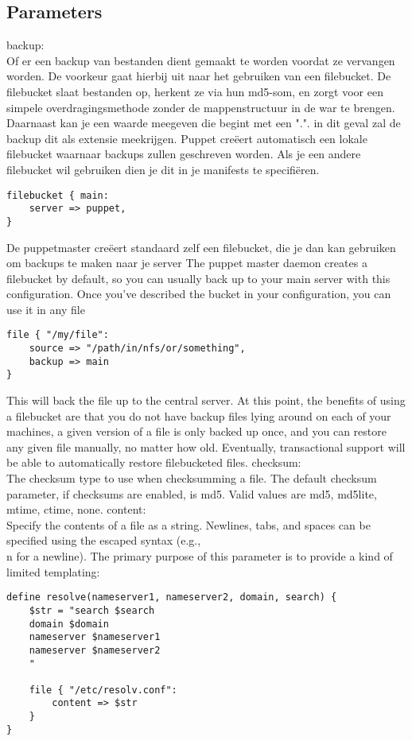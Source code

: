 \subsection{Parameters}
backup:\\
Of er een backup van bestanden dient gemaakt te worden voordat ze vervangen worden. De voorkeur gaat hierbij uit naar het gebruiken van een filebucket.	De filebucket slaat bestanden op, herkent ze via hun md5-som, en zorgt voor een simpele overdragingsmethode zonder de mappenstructuur in de war te brengen. Daarnaast kan je een waarde meegeven die begint met een ".". in dit geval zal de backup dit als extensie meekrijgen. Puppet cre\"{e}ert automatisch een lokale filebucket waarnaar backups zullen geschreven worden. Als je een andere filebucket wil gebruiken dien je dit in je manifests te specifi\"{e}ren.
\begin{code}
\begin{lstlisting}
filebucket { main:
	server => puppet,
}
\end{lstlisting}
\end{code}
%
De puppetmaster cre\"{e}ert standaard zelf een filebucket, die je dan kan gebruiken om backups te maken naar je server
The puppet master daemon creates a filebucket by default, so you can usually back up to your main server with this configuration. Once you've described the bucket in your configuration, you can use it in any file
%
\begin{code}
\begin{lstlisting}
file { "/my/file":
	source => "/path/in/nfs/or/something",
	backup => main
}
\end{lstlisting}
\end{code}
%
This will back the file up to the central server.
At this point, the benefits of using a filebucket are that you do not have backup files lying around on each of your machines, a given version of a file is only backed up once, and you can restore any given file manually, no matter how old. Eventually, transactional support will be able to automatically restore filebucketed files.
%
checksum:\\
The checksum type to use when checksumming a file.
The default checksum parameter, if checksums are enabled, is md5. Valid values are md5, md5lite, mtime, ctime, none.
%
content:\\
Specify the contents of a file as a string. Newlines, tabs, and spaces can be specified using the escaped syntax (e.g., \\n for a newline). The primary purpose of this parameter is to provide a kind of limited templating:
%
\begin{code}
\begin{lstlisting}
define resolve(nameserver1, nameserver2, domain, search) {
	$str = "search $search
	domain $domain
	nameserver $nameserver1
	nameserver $nameserver2
	"

	file { "/etc/resolv.conf":
		content => $str
	}
}
\end{lstlisting}
\end{code}

